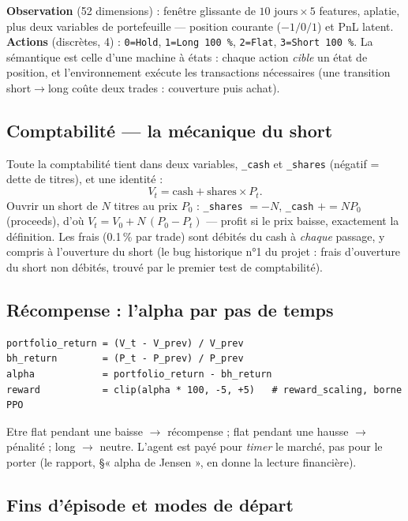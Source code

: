 \documentclass[11pt,a4paper]{article}
\newcommand{\code}[1]{\texttt{#1}}
\begin{document}
\textbf{Observation} (52 dimensions) : fenêtre glissante de
$10 \text{ jours} \times 5$ features, aplatie, plus deux variables de
portefeuille --- position courante ($-1/0/1$) et PnL latent. \textbf{Actions}
(discrètes, 4) : \code{0=Hold}, \code{1=Long 100\,\%}, \code{2=Flat},
\code{3=Short 100\,\%}. La sémantique est celle d'une machine à états : chaque
action \emph{cible} un état de position, et l'environnement exécute les
transactions nécessaires (une transition short$\to$long coûte deux trades :
couverture puis achat).

\subsection{Comptabilité --- la mécanique du short}

Toute la comptabilité tient dans deux variables, \code{\_cash} et
\code{\_shares} (négatif = dette de titres), et une identité :
\[
V_t = \mathrm{cash} + \mathrm{shares} \times P_t .
\]
Ouvrir un short de $N$ titres au prix $P_0$ : \code{\_shares} $= -N$,
\code{\_cash} $\mathrel{+}= N P_0$ (proceeds), d'où
$V_t = V_0 + N\,(P_0 - P_t)$ --- profit si le prix baisse, exactement la
définition. Les frais (0.1\,\% par trade) sont débités du cash à
\emph{chaque} passage, y compris à l'ouverture du short (le bug historique
n°1 du projet : frais d'ouverture du short non débités, trouvé par le premier
test de comptabilité).

\subsection{Récompense : l'alpha par pas de temps}

\begin{lstlisting}
portfolio_return = (V_t - V_prev) / V_prev
bh_return        = (P_t - P_prev) / P_prev
alpha            = portfolio_return - bh_return
reward           = clip(alpha * 100, -5, +5)   # reward_scaling, borne PPO
\end{lstlisting}

Etre flat pendant une baisse $\to$ récompense ; flat pendant une hausse $\to$
pénalité ; long $\to$ neutre. L'agent est payé pour \emph{timer} le marché,
pas pour le porter (le rapport, §« alpha de Jensen », en donne la lecture
financière).

\subsection{Fins d'épisode et modes de départ}
\end{document}
